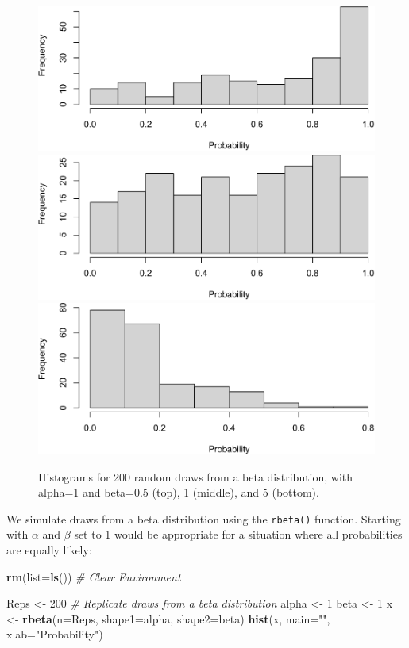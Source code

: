 \documentclass[
]{krantz}
\makeatletter
\newenvironment{Shaded}{\begin{snugshade}}{\end{snugshade}}
\newcommand{\AttributeTok}[1]{\textcolor[rgb]{0.27,0.27,0.27}{#1}}
\newcommand{\CommentTok}[1]{\textcolor[rgb]{0.37,0.37,0.37}{\textit{#1}}}
\newcommand{\DecValTok}[1]{\textcolor[rgb]{0.06,0.06,0.06}{#1}}
\newcommand{\FunctionTok}[1]{\textcolor[rgb]{0.27,0.27,0.27}{\textbf{#1}}}
\newcommand{\NormalTok}[1]{#1}
\newcommand{\OtherTok}[1]{\textcolor[rgb]{0.37,0.37,0.37}{#1}}
\newcommand{\StringTok}[1]{\textcolor[rgb]{0.5,0.5,0.5}{#1}}
\newenvironment{kframe}{%
\medskip{}
\setlength{\fboxsep}{.8em}
 \def\at@end@of@kframe{}%
 \ifinner\ifhmode%
  \def\at@end@of@kframe{\end{minipage}}%
  \begin{minipage}{\columnwidth}%
 \fi\fi%
 \def\FrameCommand##1{\hskip\@totalleftmargin \hskip-\fboxsep
 \colorbox{shadecolor}{##1}\hskip-\fboxsep
     \hskip-\linewidth \hskip-\@totalleftmargin \hskip\columnwidth}%
 \MakeFramed {\advance\hsize-\width
   \@totalleftmargin\z@ \linewidth\hsize
   \@setminipage}}%
 {\par\unskip\endMakeFramed%
 \at@end@of@kframe}
\renewenvironment{Shaded}{\begin{kframe}}{\end{kframe}}
\makeatother
\begin{document}
\begin{figure}
\includegraphics[width=0.9\linewidth]{bookdown_files/figure-latex/Beta-1} \includegraphics[width=0.9\linewidth]{bookdown_files/figure-latex/Beta-2} \includegraphics[width=0.9\linewidth]{bookdown_files/figure-latex/Beta-3} \caption{Histograms for 200 random draws from a beta distribution, with alpha=1 and beta=0.5  (top), 1 (middle), and 5 (bottom).}\label{fig:Beta}
\end{figure}

We simulate draws from a beta distribution using the \texttt{rbeta()} function. Starting with \(\alpha\) and \(\beta\) set to 1 would be appropriate for a situation where all probabilities are equally likely:

\begin{Shaded}
\begin{Highlighting}[]
\FunctionTok{rm}\NormalTok{(}\AttributeTok{list=}\FunctionTok{ls}\NormalTok{()) }\CommentTok{\# Clear Environment}

\NormalTok{Reps }\OtherTok{\textless{}{-}} \DecValTok{200} \CommentTok{\# Replicate draws from a beta distribution}
\NormalTok{alpha }\OtherTok{\textless{}{-}} \DecValTok{1}
\NormalTok{beta }\OtherTok{\textless{}{-}} \DecValTok{1}
\NormalTok{x }\OtherTok{\textless{}{-}} \FunctionTok{rbeta}\NormalTok{(}\AttributeTok{n=}\NormalTok{Reps, }\AttributeTok{shape1=}\NormalTok{alpha, }\AttributeTok{shape2=}\NormalTok{beta)}
\FunctionTok{hist}\NormalTok{(x, }\AttributeTok{main=}\StringTok{""}\NormalTok{, }\AttributeTok{xlab=}\StringTok{"Probability"}\NormalTok{)}
\end{Highlighting}
\end{Shaded}
\end{document}
